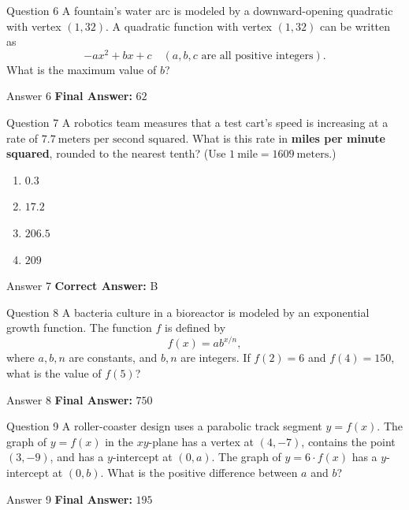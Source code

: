 \documentclass{beamer}
\begin{document}
\begin{frame}{Question 6}
\small
A fountain’s water arc is modeled by a downward-opening quadratic with vertex \((1, 32)\). A quadratic function with vertex \((1, 32)\) can be written as
\[
 -ax^2 + bx + c \quad (a, b, c \text{ are all positive integers}).
\]
What is the maximum value of \(b\)?
\end{frame}
\begin{frame}{Answer 6}
\small
\textbf{Final Answer:} $\boxed{62}$
\end{frame}

\begin{frame}{Question 7}
\small
A robotics team measures that a test cart’s speed is increasing at a rate of \(7.7\ \text{meters per second squared}\). What is this rate in \textbf{miles per minute squared}, rounded to the nearest tenth? (Use \(1\ \text{mile} = 1609\ \text{meters}\).)
\vspace{0.35cm}
\begin{enumerate}
    \item[A.] \(0.3\)
    \item[B.] \(17.2\)
    \item[C.] \(206.5\)
    \item[D.] \(209\)
\end{enumerate}
\end{frame}
\begin{frame}{Answer 7}
\small
\textbf{Correct Answer:} B
\end{frame}

\begin{frame}{Question 8}
\small
A bacteria culture in a bioreactor is modeled by an exponential growth function. The function \(f\) is defined by
\[
f(x) = ab^{x/n},
\]
where \(a, b, n\) are constants, and \(b, n\) are integers. If \(f(2) = 6\) and \(f(4) = 150\), what is the value of \(f(5)\)?
\end{frame}
\begin{frame}{Answer 8}
\small
\textbf{Final Answer:} $\boxed{750}$
\end{frame}

\begin{frame}{Question 9}
\small
A roller-coaster design uses a parabolic track segment \(y = f(x)\). The graph of \(y = f(x)\) in the \(xy\)-plane has a vertex at \((4, -7)\), contains the point \((3, -9)\), and has a \(y\)-intercept at \((0, a)\). The graph of \(y = 6 \cdot f(x)\) has a \(y\)-intercept at \((0, b)\). What is the positive difference between \(a\) and \(b\)?
\end{frame}
\begin{frame}{Answer 9}
\small
\textbf{Final Answer:} $\boxed{195}$
\end{frame}
\end{document}
